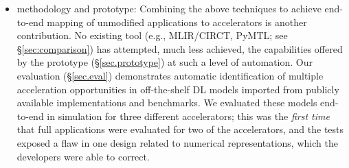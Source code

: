 \begin{itemize}

  \item {\TLA} methodology and prototype: Combining the above techniques to achieve end-to-end mapping of unmodified applications to accelerators is another contribution. No existing tool (e.g., MLIR/CIRCT, PyMTL; see  \S\ref{sec:comparison}) 
  has attempted, much less achieved, the capabilities offered by the {\TLA} prototype (\S\ref{sec.prototype}) at such a level of automation. 
  Our evaluation (\S\ref{sec.eval}) demonstrates 
  automatic identification of multiple acceleration opportunities in off-the-shelf DL models imported from publicly available implementations and benchmarks. 
  We evaluated these models end-to-end in simulation for three different accelerators; this was the \textit{first time} that full applications were evaluated for two of the accelerators, and the tests exposed a flaw in one design related to numerical representations, which the developers were able to correct.

      
      

  \end{itemize}

